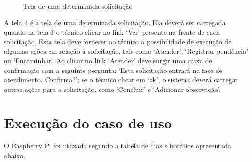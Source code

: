 \begin{figure}[ht]
    \centering
    \caption{Tela de uma determinada solicitação}
\end{figure}

A tela 4 é a tela de uma determinada solicitação. Ela deverá ser carregada quando na tela 3 o técnico clicar no link ‘Ver’ presente na frente de cada solicitação. Esta tela deve fornecer ao técnico a possibilidade de execução de algumas ações em relação à solicitação, tais como ‘Atender’, ‘Registrar pendência’ ou ‘Encaminhar’. Ao clicar no link ‘Atender’ deve surgir uma caixa de confirmação com a seguinte pergunta: ‘Esta solicitação entrará na fase de atendimento. Confirma?’; se o técnico clicar em ‘ok’, o sistema deverá carregar outras ações para a solicitação, como ‘Concluir’ e ‘Adicionar observação’.

\section{Execução do caso de uso}

O Raspberry Pi foi utlizado segundo a tabela de dias e horários apresentada abaixo.

